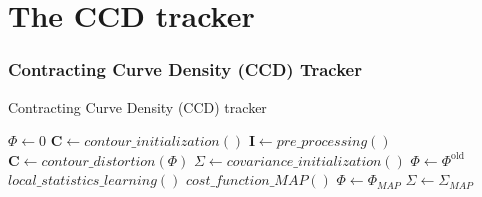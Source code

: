 \documentclass[english,10pt,presentation]{beamer}
\begin{document}
\section{The CCD tracker}
\label{sec-4}
\begin{frame}
\frametitle{Contracting Curve Density (CCD) Tracker}
\label{sec-4_1}

  \begin{algorithm}[H]
    \caption{Contracting Curve Density (CCD) tracker}
    \begin{algorithmic}[1]
      \STATE $\Phi \gets 0$
      \STATE $\mathbf{C} \gets contour\_initialization()$
        \STATE $ \mathbf{I} \gets pre\_processing()$
        \STATE $ \mathbf{C} \gets contour\_distortion(\Phi)$
        \STATE $\Sigma \gets covariance\_initialization()$
        \STATE $\Phi \gets \Phi^{\mathrm{old}}$
          \STATE $local\_statistics\_learning() $
          \STATE $cost\_function\_MAP() $
        \ENDWHILE
        \STATE $\Phi \gets \Phi_{MAP}$
        \STATE $\Sigma \gets \Sigma_{MAP}$
      \ENDWHILE
    \end{algorithmic}
  \end{algorithm}
\end{frame}
\end{document}
